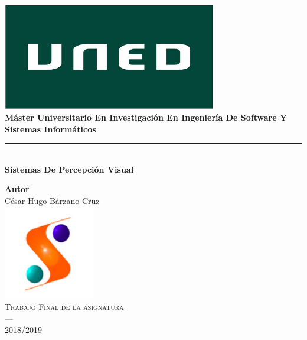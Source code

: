 \begin{titlepage}
 
 
\newlength{\centeroffset}
\setlength{\centeroffset}{-0.5\oddsidemargin}
\addtolength{\centeroffset}{0.5\evensidemargin}
\thispagestyle{empty}

\noindent\hspace*{\centeroffset}\begin{minipage}{\textwidth}

\centering
\includegraphics[width=0.7\textwidth]{imagenes/Logo-uned.jpg}\\[1.1cm]


{\Huge\bfseries Máster Universitario En Investigación En Ingeniería De Software Y Sistemas Informáticos\\
}
\noindent\rule[-1ex]{\textwidth}{3pt}\\[3.5ex]
{\large\bfseries Sistemas De Percepción Visual}
\end{minipage}

\vspace{2.5cm}
\noindent\hspace*{\centeroffset}\begin{minipage}{\textwidth}
\centering

\textbf{Autor}\\ {César Hugo Bárzano Cruz}\\[2.5ex]

\includegraphics[width=0.3\textwidth]{imagenes/Logo-master.png}\\[0.1cm]
\textsc{Trabajo Final de la asignatura}\\
\textsc{---}\\
2018/2019
\end{minipage}
\end{titlepage}


